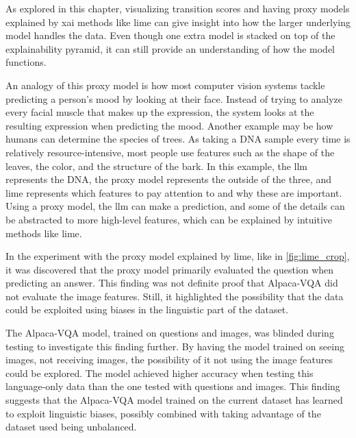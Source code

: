 As explored in this chapter, visualizing transition scores and having proxy models explained by \gls{xai} methods like \gls{lime} can give insight into how the larger underlying model handles the data. Even though one extra model is stacked on top of the explainability pyramid, it can still provide an understanding of how the model functions. 

An analogy of this proxy model is how most computer vision systems tackle predicting a person's mood by looking at their face. Instead of trying to analyze every facial muscle that makes up the expression, the system looks at the resulting expression when predicting the mood. 
Another example may be how humans can determine the species of trees. As taking a DNA sample every time is relatively resource-intensive, most people use features such as the shape of the leaves, the color, and the structure of the bark. In this example, the \gls{llm} represents the DNA, the proxy model represents the outside of the three, and \gls{lime} represents which features to pay attention to and why these are important. 
Using a proxy model, the \gls{llm} can make a prediction, and some of the details can be abstracted to more high-level features, which can be explained by intuitive methods like \gls{lime}.

In the experiment with the proxy model explained by \gls{lime}, like in \autoref{fig:lime_crop}, it was discovered that the proxy model primarily evaluated the question when predicting an answer. 
This finding was not definite proof that Alpaca-VQA did not evaluate the image features. Still, it highlighted the possibility that the data could be exploited using biases in the linguistic part of the dataset. 

The Alpaca-VQA model, trained on questions and images, was blinded during testing to investigate this finding further. By having the model trained on seeing images, not receiving images, the possibility of it not using the image features could be explored. The model achieved higher accuracy when testing this language-only data than the one tested with questions and images.
This finding suggests that the Alpaca-VQA model trained on the current dataset has learned to exploit linguistic biases, possibly combined with taking advantage of the dataset used being unbalanced. 


